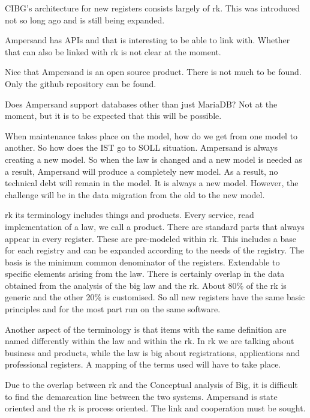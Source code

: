 CIBG's architecture for new registers consists largely of \acrlong{rk}. 
This was introduced not so long ago and is still being expanded.

Ampersand has APIs and that is interesting to be able to link with. 
Whether that can also be linked with \acrlong{rk} is not clear at the moment.

Nice that Ampersand is an open source product. 
There is not much to be found. 
Only the github repository can be found.

Does Ampersand support databases other than just MariaDB? Not at the moment, but it is to be expected that this will be possible.

When maintenance takes place on the model, how do we get from one model to another. 
So how does the IST go to SOLL situation. 
Ampersand is always creating a new model. 
So when the law is changed and a new model is needed as a result, Ampersand will produce a completely new model. 
As a result, no technical debt will remain in the model.
It is always a new model. 
However, the challenge will be in the data migration from the old to the new model.

\acrlong{rk} its terminology includes things and products. 
Every service, read implementation of a law, we call a product. 
There are standard parts that always appear in every register. 
These are pre-modeled within \acrlong{rk}. 
This includes a base for each registry and can be expanded according to the needs of the registry. 
The basis is the minimum common denominator of the registers. 
Extendable to specific elements arising from the law. 
There is certainly overlap in the data obtained from the analysis of the big law and the \acrlong{rk}. 
About 80\% of the \acrlong{rk} is generic and the other 20\% is customised. 
So all new registers have the same basic principles and for the most part run on the same software.

Another aspect of the terminology is that items with the same definition are named differently within the law and within the \acrlong{rk}. In \acrlong{rk} we are talking about business and products, while the law is big about registrations, applications and professional registers. 
A mapping of the terms used will have to take place.

Due to the overlap between \acrlong{rk} and the Conceptual analysis of Big, it is difficult to find the demarcation line between the two systems. 
Ampersand is state oriented and the \acrlong{rk} is process oriented. 
The link and cooperation must be sought.

